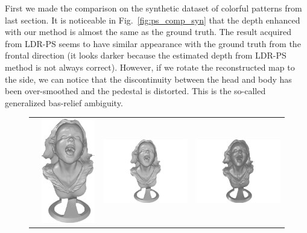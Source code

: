 First we made the comparison on the synthetic dataset of colorful patterns from last section.
It is noticeable in Fig.~\ref{fig:ps_comp_syn} that the depth enhanced with our method is almost the same as the ground truth.
The result acquired from LDR-PS seems to have similar appearance with the ground truth from the frontal direction (it looks darker because the estimated depth from LDR-PS method is not always correct).
However, if we rotate the reconstructed map to the side, we can notice that the discontinuity between the head and body has been over-smoothed and the pedestal is distorted.
This is the so-called generalized bas-relief ambiguity.

\begin{figure}[H]
\centering
\setlength{\tabcolsep}{0.1em} %
 {\renewcommand{\arraystretch}{1.6}%
\begin{tabular}{c c c c}
   \multirow{-6}{*}{\parbox[t]{2.5mm}{}} &    
   \includegraphics[height = 0.24\linewidth]{figures/result/comp_gt_shape.pdf} 
   &
   \includegraphics[height = 0.24\linewidth]{figures/result/ps2_robust_front.pdf} &
   \includegraphics[height = 0.24\linewidth]{figures/result/ps2_LDR_front.pdf} \\


\end{tabular}}
\end{figure}
